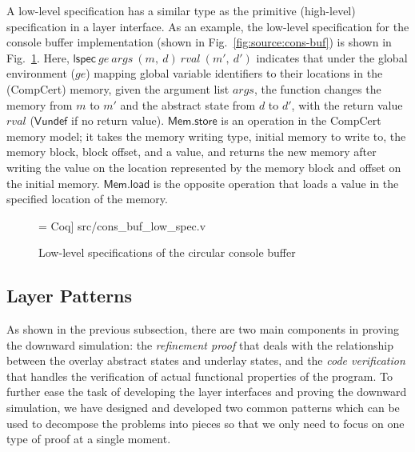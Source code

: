 A low-level specification has a similar type as the primitive
(high-level) specification in a layer interface.
As an example, the low-level specification for the console buffer
implementation (shown in Fig.~\ref{fig:source:cons-buf}) is shown
in Fig.~\ref{fig:cons_buf_low_spec}.
Here, $\textsf{lspec}~ ge~ args~ (m,~d)~ rval~ (m',~d')$
indicates that under the global environment ($ge$) mapping global variable
identifiers to their locations in the (CompCert) memory, given the argument list
$args$, the function changes the memory from $m$ to $m'$ and the abstract
state from $d$ to $d'$, with the return value
$rval$ ($\textsf{Vundef}$ if no return value). $\textsf{Mem.store}$ is an
operation in the CompCert memory model;  it takes the memory writing type, initial
memory to write to, the memory block, block offset, and a value, and returns the
new memory after writing the value on the location represented by the memory
block and offset on the initial memory. $\textsf{Mem.load}$ is the opposite
operation that loads a value in the specified location of the memory.


\begin{figure}
 = Coq] {src/cons_buf_low_spec.v}
\caption{Low-level specifications of the circular console buffer}
\label{fig:cons_buf_low_spec}
\end{figure}


\subsection{Layer Patterns}
As shown in the previous subsection, there are two main components in proving the
downward simulation: the {\it refinement proof} that deals with the relationship
between the overlay abstract states and underlay states, and the {\it code verification}
that handles the verification of actual functional properties of the program.
To further ease the task of developing the layer interfaces and proving the
downward simulation, we have designed and developed two common patterns which
can be used to decompose the problems into pieces so that we only need to focus
on one type of proof at a single moment.

